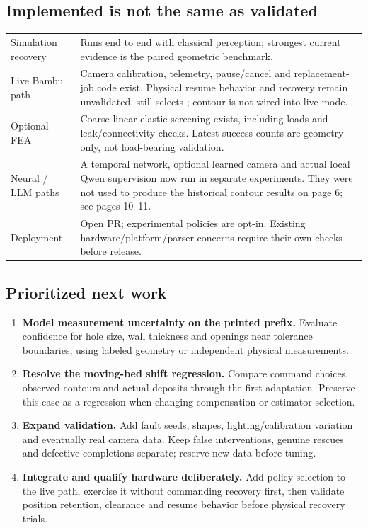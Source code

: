 \documentclass[10pt,letterpaper]{article}
\newcommand{\code}[1]{\texttt{\detokenize{#1}}}
\begin{document}
\subsection*{Implemented is not the same as validated}
\begin{tabularx}{\linewidth}{@{}p{1.35in}Y@{}}
\toprule
Simulation recovery & Runs end to end with classical perception; strongest current evidence is the paired geometric benchmark.\\
Live Bambu path & Camera calibration, telemetry, pause/cancel and replacement-job code exist. Physical resume behavior and recovery remain unvalidated. \code{run_live} still selects \code{RulePolicy}; contour is not wired into live mode.\\
Optional FEA & Coarse linear-elastic screening exists, including loads and leak/connectivity checks. Latest success counts are geometry-only, not load-bearing validation.\\
Neural / LLM paths & A temporal network, optional learned camera and actual local Qwen supervision now run in separate experiments. They were not used to produce the historical contour results on page 6; see pages 10--11.\\
Deployment & Open PR; experimental policies are opt-in. Existing hardware/platform/parser concerns require their own checks before release.\\
\bottomrule
\end{tabularx}

\subsection*{Prioritized next work}
\begin{enumerate}
\item \textbf{Model measurement uncertainty on the printed prefix.} Evaluate
confidence for hole size, wall thickness and openings near tolerance boundaries,
using labeled geometry or independent physical measurements.
\item \textbf{Resolve the moving-bed shift regression.} Compare command choices,
observed contours and actual deposits through the first adaptation. Preserve
this case as a regression when changing compensation or estimator selection.
\item \textbf{Expand validation.} Add fault seeds, shapes, lighting/calibration
variation and eventually real camera data. Keep false interventions, genuine
rescues and defective completions separate; reserve new data before tuning.
\item \textbf{Integrate and qualify hardware deliberately.} Add policy selection
to the live path, exercise it without commanding recovery first, then validate
position retention, clearance and resume behavior before physical recovery trials.
\end{enumerate}
\end{document}
